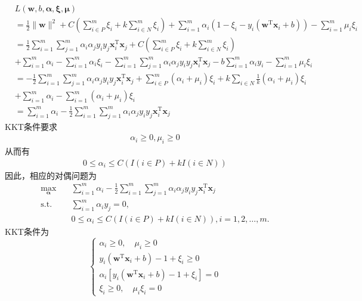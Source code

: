 \documentclass[a4paper,utf8]{article}
\begin{document}
	\begin{equation}
		\begin{split}
			& L(\bm{w},b,\bm{\alpha},\bm{\xi},\bm{\mu}) \\
			& =\frac{1}{2}\lVert\bm{w}\rVert^2
			  +C(\sum_{i\in P}^m\xi_i+k\sum_{i\in N}^m\xi_i)
			  +\sum_{i=1}^m\alpha_i(1-\xi_i-y_i(\bm{w}^\mathrm{T}\bm{x}_i+b))
			  -\sum_{i=1}^m\mu_i\xi_i \\
			& =\frac{1}{2}\sum_{i=1}^m\sum_{j=1}^m \alpha_i\alpha_j y_iy_j\bm{x}_i^\mathrm{T}\bm{x}_j
			  +C(\sum_{i\in P}^m\xi_i+k\sum_{i\in N}^m\xi_i) \\
			& +\sum_{i=1}^m\alpha_i
			  -\sum_{i=1}^m\alpha_i\xi_i
			  -\sum_{i=1}^m\sum_{j=1}^m \alpha_i\alpha_j y_iy_j\bm{x}_i^\mathrm{T}\bm{x}_j
			  -b\sum_{i=1}^m\alpha_i y_i
			  -\sum_{i=1}^m\mu_i\xi_i \\
			& =-\frac{1}{2}\sum_{i=1}^m\sum_{j=1}^m \alpha_i\alpha_j y_iy_j\bm{x}_i^\mathrm{T}\bm{x}_j
			  +\sum_{i\in P}^m(\alpha_i+\mu_i)\xi_i +k\sum_{i\in N}\frac{1}{k}(\alpha_i+\mu_i)\xi_i \\
			& +\sum_{i=1}^m\alpha_i
			  -\sum_{i=1}^m(\alpha_i+\mu_i)\xi_i \\
			& =\sum_{i=1}^m\alpha_i
			  -\frac{1}{2}\sum_{i=1}^m\sum_{j=1}^m \alpha_i\alpha_j y_iy_j\bm{x}_i^\mathrm{T}\bm{x}_j
		\end{split}
	\end{equation}
	KKT条件要求
	\begin{align*}
		\alpha_i\geq 0, \mu_i\geq 0
	\end{align*}
	从而有
	\begin{align*}
		0\leq\alpha_i\leq C(I(i\in P)+kI(i\in N))
	\end{align*}
	因此，相应的对偶问题为
	\begin{equation}
		\begin{split}
			\max_{\bm{\alpha}}
			& \quad \sum_{i=1}^m\alpha_i - \frac{1}{2}\sum_{i=1}^m\sum_{j=1}^m \alpha_i\alpha_j y_iy_j\bm{x}_i^\mathrm{T}\bm{x}_j \\
			\text{s.t.}
			& \quad \sum_{i=1}^m \alpha_i y_j=0, \\
			& \quad 0\leq\alpha_i\leq C(I(i\in P)+kI(i\in N)), i = 1,2,\dots,m.
		\end{split}
	\end{equation}
	KKT条件为
	\begin{equation}
		\begin{cases}
			\alpha_i\geq 0,\quad \mu_i\geq 0 \\
			y_i(\bm{w}^\mathrm{T}\bm{x}_i+b)-1+\xi_i \geq 0 \\
			\alpha_i[y_i(\bm{w}^\mathrm{T}\bm{x}_i+b)-1+\xi_i]=0 \\
			\xi_i\geq 0,\quad \mu_i\xi_i=0
		\end{cases}
	\end{equation}
\end{document}
